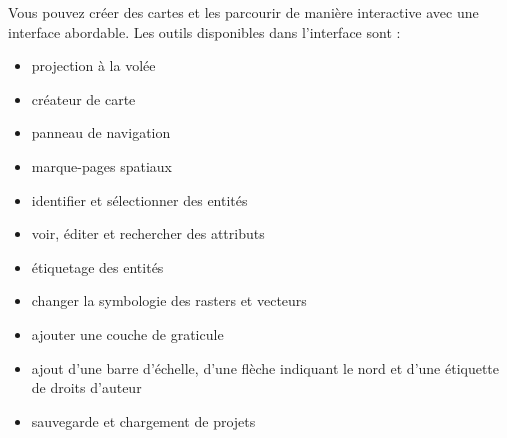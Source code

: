 

Vous pouvez cr\'eer des cartes et les parcourir de mani\`ere interactive avec une interface abordable. Les outils disponibles dans l'interface sont :


\begin{itemize}
\item projection \`a la vol\'ee
\item cr\'eateur de carte
\item panneau de navigation
\item marque-pages spatiaux
\item identifier et s\'electionner des entit\'es
\item voir, \'editer et rechercher des attributs
\item \'etiquetage des entit\'es
\item changer la symbologie des rasters et vecteurs
\item ajouter une couche de graticule
\item ajout d'une barre d'\'echelle, d'une fl\`eche indiquant le nord et d'une \'etiquette de droits d'auteur
\item sauvegarde et chargement de projets
\end{itemize}



